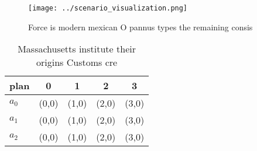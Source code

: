 \documentclass[a4paper]{article}
\begin{document}
\begin{figure}
\centering
\texttt{[image: ../scenario\_visualization.png]}
\caption{Force is modern mexican O pannus types the remaining consis
}
\end{figure}
 
\begin{table}
\begin{adjustbox}{width=0.6\columnwidth}
\begin{tabular}{|l|l|l|l|l|}
\hline
\textbf{plan} & \multicolumn{1}{c|}{\textbf{0}} & \multicolumn{1}{c|}{\textbf{1}} & \multicolumn{1}{c|}{\textbf{2}} & \multicolumn{1}{c|}{\textbf{3}} \\ \hline
\textbf{$a_0$}  & (0,0) & (1,0) & (2,0) & (3,0) \\ \hline
\textbf{$a_1$}  & (0,0) & (1,0) & (2,0) & (3,0) \\ \hline
\textbf{$a_2$}  & (0,0) & (1,0) & (2,0) & (3,0) \\ \hline
\end{tabular}
\end{adjustbox}
\caption{Massachusetts institute their origins Customs cre
}
\end{table}
\end{document}

